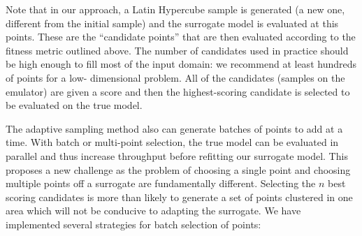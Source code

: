 Note that in our approach, a Latin Hypercube sample is generated (a new one, 
different from the initial sample) and the surrogate model is evaluated 
at this points.  These are the ``candidate points'' that are then evaluated 
according to the fitness metric outlined above.  The number of candidates used 
in practice should be high enough to fill most
of the input domain: we recommend at least hundreds of points for a low-
dimensional problem. 
All of the candidates (samples on the emulator) are 
given a score and then the highest-scoring candidate is selected to be evaluated
on the true model. 

The adaptive sampling method also can generate batches of points 
to add at a time. With batch or  multi-point 
selection, the true model can be evaluated in parallel and thus
increase throughput before refitting our surrogate model. This proposes a new
challenge as the problem of choosing a single point and choosing multiple points
off a surrogate are fundamentally different. Selecting the $n$ best scoring
candidates is more than likely to generate a set of points clustered in one
area which will not be conducive to adapting the surrogate.
We have implemented several strategies for batch selection of points: 
